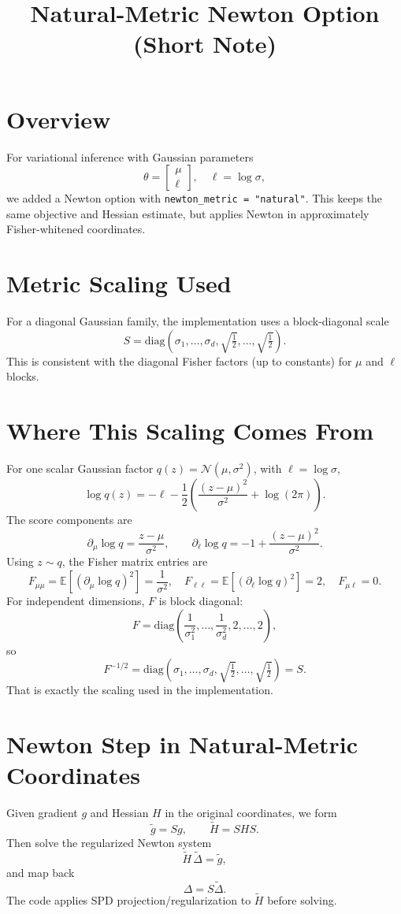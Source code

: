 \documentclass[11pt]{article}
\title{Natural-Metric Newton Option (Short Note)}
\author{}
\date{}
\begin{document}
\maketitle

\section*{Overview}
For variational inference with Gaussian parameters
\[
\theta = \begin{bmatrix}\mu \\ \ell\end{bmatrix},
\quad \ell = \log \sigma,
\]
we added a Newton option with \texttt{newton\_metric = "natural"}.
This keeps the same objective and Hessian estimate, but applies Newton in
approximately Fisher-whitened coordinates.

\section*{Metric Scaling Used}
For a diagonal Gaussian family, the implementation uses a block-diagonal scale
\[
S = \mathrm{diag}\!\left(\sigma_1,\dots,\sigma_d,\sqrt{\tfrac12},\dots,\sqrt{\tfrac12}\right).
\]
This is consistent with the diagonal Fisher factors (up to constants) for
\(\mu\) and \(\ell\) blocks.

\section*{Where This Scaling Comes From}
For one scalar Gaussian factor \(q(z)=\mathcal N(\mu,\sigma^2)\), with
\(\ell=\log \sigma\),
\[
\log q(z) = -\ell - \frac12\left(\frac{(z-\mu)^2}{\sigma^2} + \log(2\pi)\right).
\]
The score components are
\[
\partial_\mu \log q = \frac{z-\mu}{\sigma^2},
\qquad
\partial_\ell \log q = -1 + \frac{(z-\mu)^2}{\sigma^2}.
\]
Using \(z\sim q\), the Fisher matrix entries are
\[
F_{\mu\mu} = \mathbb E\!\left[(\partial_\mu \log q)^2\right] = \frac{1}{\sigma^2},
\quad
F_{\ell\ell} = \mathbb E\!\left[(\partial_\ell \log q)^2\right] = 2,
\quad
F_{\mu\ell}=0.
\]
For independent dimensions, \(F\) is block diagonal:
\[
F = \mathrm{diag}\!\left(\frac{1}{\sigma_1^2},\dots,\frac{1}{\sigma_d^2},2,\dots,2\right),
\]
so
\[
F^{-1/2}
= \mathrm{diag}\!\left(\sigma_1,\dots,\sigma_d,\sqrt{\tfrac12},\dots,\sqrt{\tfrac12}\right)
= S.
\]
That is exactly the scaling used in the implementation.

\section*{Newton Step in Natural-Metric Coordinates}
Given gradient \(g\) and Hessian \(H\) in the original coordinates, we form
\[
\tilde g = S g,\qquad \tilde H = S H S.
\]
Then solve the regularized Newton system
\[
\tilde H\,\tilde\Delta = \tilde g,
\]
and map back
\[
\Delta = S \tilde\Delta.
\]
The code applies SPD projection/regularization to \(\tilde H\) before solving.
\end{document}
